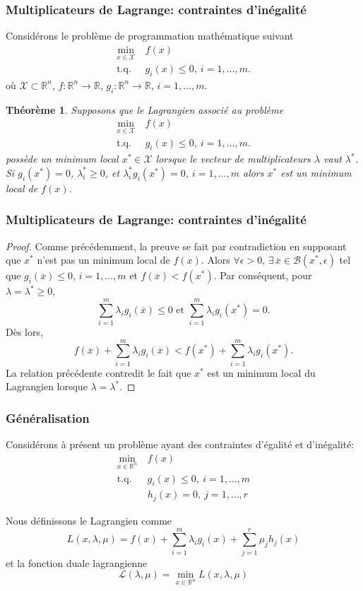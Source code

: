 \documentclass[usepdftitle=false]{beamer}
\newtheorem{thm}{Théorème}
\def\cB{\mathcal{B}}
\def\cL{\mathcal{L}}
\def\cX{\mathcal{X}}
\def\RR{\mathbb{R}}
\begin{document}
\begin{frame}
\frametitle{Multiplicateurs de Lagrange: contraintes d'inégalité}

Considérons le problème de programmation mathématique suivant
\begin{align*}
\min_{x \in \cX} \ & f(x) \\
\mbox{t.q. } & g_i(x) \leq 0,\ i = 1,\ldots,m.
\end{align*}
où $\cX \subset \RR^n$, $f: \RR^n \rightarrow \RR$, $g_i: \RR^n \rightarrow \RR$, $i = 1,\ldots,m$.

\mbox{}

\begin{thm}
Supposons que le Lagrangien associé au problème
\begin{align*}
\min_{x \in \cX} \ & f(x) \\
\mbox{t.q. } & g_i(x) \leq 0,\ i = 1,\ldots,m.
\end{align*}
possède un minimum local $x^* \in \cX$ lorsque le vecteur de multiplicateurs $\lambda$ vaut $\lambda^*$.
Si $g_i(x^*) = 0$, $\lambda^*_i \geq 0$, et $\lambda^*_i g_i(x^*) = 0$, $i = 1,\ldots,m$ alors $x^*$ est un minimum local de $f(x)$.
\end{thm}

\end{frame}

\begin{frame}
\frametitle{Multiplicateurs de Lagrange: contraintes d'inégalité}
	
\begin{proof}
Comme précédemment, la preuve se fait par contradiction en supposant que $x^*$ n'est pas un minimum local de $f(x)$.
Alors $\forall \epsilon > 0$, $\exists\, \overline{x} \in \cB(x^*, \epsilon)$ tel que $g_i(\overline{x}) \leq 0$, $i = 1,\ldots,m$ et $f(\overline{x}) < f(x^*)$.
Par conséquent, pour $\lambda = \lambda^* \geq 0$,
$$
\sum_{i = 1}^{m} \lambda_i g_i(\overline{x}) \leq 0 \mbox{ et }
\sum_{i = 1}^{m} \lambda_i g_i(x^*) = 0.
$$
Dès lors,
$$
f(\overline{x}) + \sum_{i = 1}^{m} \lambda_i g_i(\overline{x}) < f(x^*) + \sum_{i = 1}^{m} \lambda_i g_i(x^*).
$$
La relation précédente contredit le fait que $x^*$ est un
minimum local du Lagrangien lorsque $\lambda = \lambda^*$.
\end{proof}

\end{frame}

\begin{frame}
\frametitle{Généralisation}

Considérons à présent un problème ayant des contraintes d'égalité et d'inégalité:
\begin{align*}
\min_{x \in \mathbb{R}^n} \ & f(x) \\
\mbox{t.q. } & g_i(x) \leq 0,\ i = 1,\ldots,m \\
& h_j(x) = 0,\ j = 1,\ldots,r
\end{align*}

Nous définissons le Lagrangien comme
$$
L(x, \lambda, \mu) = f(x) + \sum_{i = 1}^m \lambda_i g_i(x)
 + \sum_{j = 1}^r \mu_j h_j(x)
$$
et la fonction duale lagrangienne
$$
\cL(\lambda, \mu) = \min_{x \in \mathbb{R}^n} L(x, \lambda, \mu)
$$

\end{frame}
\end{document}
